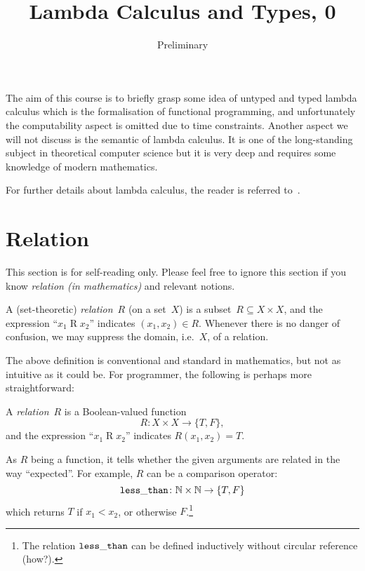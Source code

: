 \title{Lambda Calculus and Types, 0}
\subtitle{Preliminary}

\begin{frame}
\maketitle
\end{frame}

The aim of this course is to briefly grasp some idea of untyped and typed lambda
calculus which is the formalisation of functional programming, and unfortunately
the computability aspect is omitted due to time constraints. Another aspect we
will not discuss is the semantic of lambda calculus. It is one of the
long-standing subject in theoretical computer science but it is very deep
and requires some knowledge of modern mathematics. 

For further details about lambda calculus, the reader is referred
to~\cite{Barendregt1984,Barendregt1992,Barendregt1984a}. 

\section{Relation}
This section is for self-reading only. Please feel free to ignore this section
if you know \emph{relation (in mathematics)} and relevant notions.

\begin{definition}
  A (set-theoretic) \emph{relation}~$R$ (on a set~$X$) is a subset~$R
  \subseteq X \times X$, and the expression ``$x_1 \mathbin{R} x_2$'' indicates
  $(x_1, x_2) \in R$.  Whenever there is no danger of confusion, we may suppress
  the domain, i.e.\ $X$, of a relation. 
\end{definition}

The above definition is conventional and standard in mathematics, but not as
intuitive as it could be. For programmer, the following is perhaps more
straightforward:
\begin{definition}[Functional]
  A \emph{relation}~$R$ is a Boolean-valued function 
  \[
    R\colon X \times X \to \{T, F\},
  \]
  and the expression ``$x_1 \mathbin{R} x_2$'' indicates $R(x_1, x_2) = T$.
\end{definition}

As $R$ being a function, it tells whether the given arguments are related in the
way ``expected''. For example, $R$ can be a comparison operator:
\[
  {\tt less\_than}\colon \mathbb{N} \times \mathbb{N} \to \{T, F\}
\]
which returns $T$ if $x_1 < x_2$, or otherwise $F$.\footnote{%
  The relation ${\tt less\_than}$ can be defined inductively without circular
  reference (how?).}

